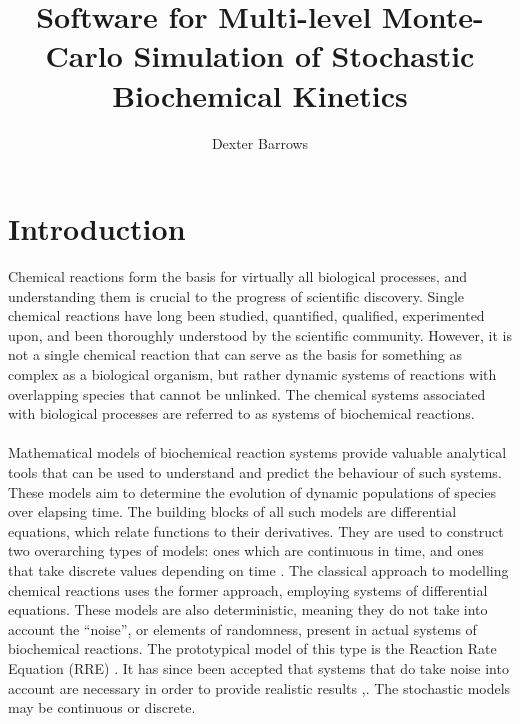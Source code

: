 \documentclass[ugrad,lot,lof,openright,11pt,oneside,onehalfspace]{RUthesis}
\title{Software for Multi-level Monte-Carlo Simulation of Stochastic Biochemical Kinetics}
\author{Dexter Barrows}
\begin{document}
\maketitle

\chapter{Introduction}

	Chemical reactions form the basis for virtually all biological processes, and understanding them is crucial to the progress of scientific discovery. Single chemical reactions have long been studied, quantified, qualified, experimented upon, and been thoroughly understood by the scientific community. However, it is not a single chemical reaction that can serve as the basis for something as complex as a biological organism, but rather dynamic systems of reactions with overlapping species that cannot be unlinked. The chemical systems associated with biological processes are referred to as systems of biochemical reactions.\\
	\\
	Mathematical models of biochemical reaction systems provide valuable analytical tools that can be used to understand and predict the behaviour of such systems. These models aim to determine the evolution of dynamic populations of species over elapsing time. The building blocks of all such models are differential equations, which relate functions to their derivatives. They are used to construct two overarching types of models: ones which are continuous in time, and ones that take discrete values depending on time \cite{sys_bio_intro}. The classical approach to modelling chemical reactions uses the former approach, employing systems of differential equations. These models are also deterministic, meaning they do not take into account the ``noise'', or elements of randomness, present in actual systems of biochemical reactions. The prototypical model of this type is the Reaction Rate Equation (RRE) \cite{gillespie_review}. It has since been accepted that systems that do take noise into account are necessary in order to provide realistic results \cite{phage_bacteria},\cite{sys_bio_intro}. The stochastic models may be continuous or discrete.\\
	\\
\end{document}
